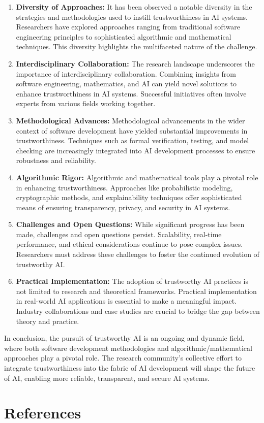 \documentclass{article}
\begin{document}
\begin{enumerate}
    
    \item \textbf{Diversity of Approaches:} It has been observed a notable diversity in the strategies and methodologies used to instill trustworthiness in AI systems. Researchers have explored approaches ranging from traditional software engineering principles to sophisticated algorithmic and mathematical techniques. This diversity highlights the multifaceted nature of the challenge.

    \item \textbf{Interdisciplinary Collaboration:} The research landscape underscores the importance of interdisciplinary collaboration. Combining insights from software engineering, mathematics, and AI can yield novel solutions to enhance trustworthiness in AI systems. Successful initiatives often involve experts from various fields working together.

    \item \textbf{Methodological Advances:} Methodological advancements in the wider context of software development have yielded substantial improvements in trustworthiness. Techniques such as formal verification, testing, and model checking are increasingly integrated into AI development processes to ensure robustness and reliability.

    \item \textbf{Algorithmic Rigor:} Algorithmic and mathematical tools play a pivotal role in enhancing trustworthiness. Approaches like probabilistic modeling, cryptographic methods, and explainability techniques offer sophisticated means of ensuring transparency, privacy, and security in AI systems.

    \item \textbf{Challenges and Open Questions:} While significant progress has been made, challenges and open questions persist. Scalability, real-time performance, and ethical considerations continue to pose complex issues. Researchers must address these challenges to foster the continued evolution of trustworthy AI.

    \item \textbf{Practical Implementation:} The adoption of trustworthy AI practices is not limited to research and theoretical frameworks. Practical implementation in real-world AI applications is essential to make a meaningful impact. Industry collaborations and case studies are crucial to bridge the gap between theory and practice.

\end{enumerate}

In conclusion, the pursuit of trustworthy AI is an ongoing and dynamic field, where both software development methodologies and algorithmic/mathematical approaches play a pivotal role. The research community's collective effort to integrate trustworthiness into the fabric of AI development will shape the future of AI, enabling more reliable, transparent, and secure AI systems.

\newpage
\section{References}


\end{document}
